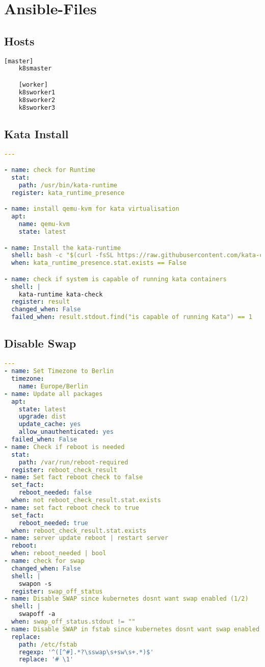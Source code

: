 \chapter{Ansible-Files}

\section{Hosts}
\label{app:hosts_file}
\begin{lstlisting}[language=bash, caption=hosts]
    [master]
    k8smaster

    [worker]
    k8sworker1
    k8sworker2
    k8sworker3    
\end{lstlisting}

\section{Kata Install}
\label{app:kata_install}
\begin{lstlisting}[language=yaml, caption={ansible role}]
---

- name: check for Runtime
  stat:
    path: /usr/bin/kata-runtime
  register: kata_runtime_presence

- name: install qemu-kvm for kata virtualisation
  apt:
    name: qemu-kvm
    state: latest

- name: Install the kata-runtime 
  shell: bash -c "$(curl -fsSL https://raw.githubusercontent.com/kata-containers/tests/master/cmd/kata-manager/kata-manager.sh) install-packages"
  when: kata_runtime_presence.stat.exists == False

- name: check if system is capable of running kata containers
  shell: |
    kata-runtime kata-check
  register: result
  changed_when: False 
  failed_when: result.stdout.find("is capable of running Kata") == 1
\end{lstlisting}

\section{Disable Swap}
\label{app:base_role}
\begin{lstlisting}[language=yaml, caption={base role}]
---
- name: Set Timezone to Berlin
  timezone:
    name: Europe/Berlin
- name: Update all packages
  apt:
    state: latest
    upgrade: dist
    update_cache: yes
    allow_unauthenticated: yes
  failed_when: False
- name: Check if reboot is needed
  stat:
    path: /var/run/reboot-required
  register: reboot_check_result
- name: Set fact reboot check to false
  set_fact:
    reboot_needed: false
  when: not reboot_check_result.stat.exists
- name: set fact reboot check to true
  set_fact:
    reboot_needed: true
  when: reboot_check_result.stat.exists
- name: server update reboot | restart server
  reboot:
  when: reboot_needed | bool
- name: check for swap
  changed_when: False
  shell: |
    swapon -s
  register: swap_off_status
- name: Disable SWAP since kubernetes dosnt want swap enabled (1/2)
  shell: |
    swapoff -a
  when: swap_off_status.stdout != ""
- name: Disable SWAP in fstab since kubernetes dosnt want swap enabled (2/2)
  replace:
    path: /etc/fstab
    regexp: '^([^#].*?\sswap\s+sw\s+.*)$'
    replace: '# \1'
\end{lstlisting}

